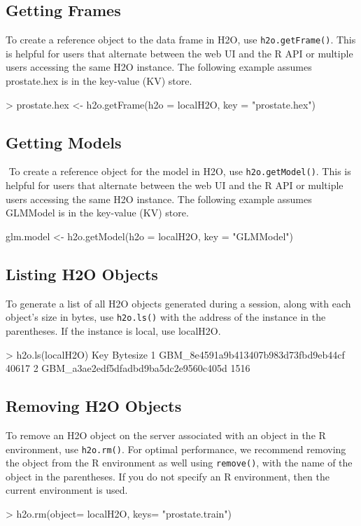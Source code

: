 \documentclass[11pt]{article}
\begin{document}
\subsection{Getting Frames}

To create a reference object to the data frame in H2O, use {\texttt{h2o.getFrame()}}. This is helpful for  users that alternate between the web UI and the R API or multiple users accessing the same H2O instance. The following example assumes prostate.hex is in the key-value (KV) store.

\begin{spverbatim}
> prostate.hex <- h2o.getFrame(h2o = localH2O, key = "prostate.hex")
\end{spverbatim}


\subsection{Getting Models}
 To create a reference object for the model in H2O, use {\texttt{h2o.getModel()}}. This is helpful for  users that alternate between the web UI and the R API or multiple users accessing the same H2O instance. The following example assumes GLMModel is in the key-value (KV) store.
\begin{spverbatim}
glm.model <- h2o.getModel(h2o = localH2O, key = "GLMModel")
\end{spverbatim}

\subsection{Listing H2O Objects}

To generate a list of all H2O objects generated during a session, along with each object’s size in bytes, use {\texttt{h2o.ls()}} with the address of the instance in the parentheses. If the instance is local, use localH2O. 

\begin{spverbatim}
> h2o.ls(localH2O)
                                                   Key Bytesize
      1               GBM_8e4591a9b413407b983d73fbd9eb44cf    40617
      2               GBM_a3ae2edf5dfadbd9ba5dc2e9560c405d     1516
\end{spverbatim}


\subsection{Removing H2O Objects}

To remove an H2O object on the server associated with an object in the R environment, use {\texttt{h2o.rm()}}. For optimal performance, we recommend removing the object from the R environment as well using {\texttt{remove()}}, with the name of the object in the parentheses. If you do not specify an R environment, then the current environment is used. 
\begin{spverbatim}
> h2o.rm(object= localH2O, keys= "prostate.train")
\end{spverbatim}
\end{document}
